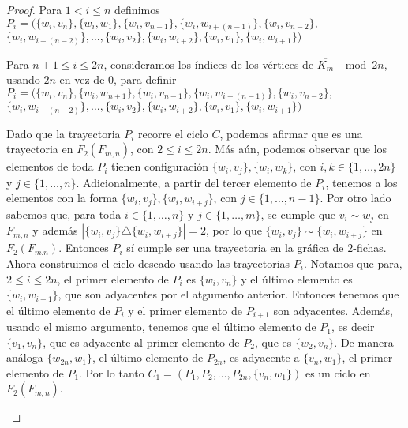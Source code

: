 \begin{proof}
    Para $1 < i \leq n$ definimos
    $P_i=(\{w_i,v_n\},\{w_i,w_1\},\{w_i,v_{n-1}\},\{w_i,w_{i+(n-1)}\},\{w_i,v_{n-2}\},$
    $\{w_i,w_{i+(n-2)}\},\dots,\{w_i,v_2\},\{w_i,w_{i+2}\},\{w_i,v_1\},\{w_i,w_{i+1}\})$

    Para $n+1\leq i \leq 2n$, consideramos los \'indices de los v\'ertices de
    $\overline{K_m}$ $\mod 2n$, usando $2n$ en vez de $0$, para definir
    $P_i=(\{w_i,v_n\},\{w_i,w_{n+1}\},\{w_i,v_{n-1}\},\{w_i,w_{i+(n-1)}\},\{w_i,v_{n-2}\},$
    $\{w_i,w_{i+(n-2)}\},\dots,
    \{w_i,v_2\},\{w_i,w_{i+2}\},\{w_i,v_1\},\{w_i,w_{i+1}\})$

    Dado que la trayectoria $P_i$ recorre el ciclo $C$, podemos afirmar que es
    una trayectoria en $F_2(F_{m,n})$, con $2\leq i \leq 2n$. M\'as a\'un,
    podemos observar que los elementos de toda $P_i$ tienen configuraci\'on
    $\{w_i,v_j\},\{w_i,w_k\}$, con $i, k\in \{1, \dots, 2n\}$ y $j \in \{1,
    \dots, n\}$. Adicionalmente, a partir del tercer elemento de $P_i$, tenemos a
    los elementos con la forma $\{w_i,v_j\},\{w_i,w_{i+j}\}$, con $j \in \{1,
    \dots, n-1\}$.  Por otro lado sabemos que, para toda $i \in \{1, \dots, n\}$
    y $j \in \{1, \dots, m\}$, se cumple que $v_i \sim w_j$ en $F_{m,n}$ y
    adem\'as $|\{w_i,v_j\} \triangle \{w_i, w_{i+j}\}|=2$, por lo que
    $\{w_i,v_j\} \sim \{w_i, w_{i+j}\}$ en $F_2(F_{m.n})$. Entonces $P_i$ s\'i
    cumple ser una trayectoria en la gr\'afica de $2$-fichas. Ahora construimos
    el ciclo deseado usando las trayectorias $P_i$. Notamos que para, $2 \leq i
    \leq 2n$, el primer elemento de $P_i$ es $\{w_i, v_n\}$ y el \'ultimo
    elemento es $\{w_i, w_{i+1}\}$, que son adyacentes por el atgumento
    anterior. Entonces tenemos que el \'ultimo elemento de $P_i$ y el primer
    elemento de $P_{i+1}$ son adyacentes. Adem\'as, usando el mismo argumento,
    tenemos que el \'ultimo elemento de $P_1$, es decir $\{v_1,v_n\}$, que es
    adyacente al primer elemento de $P_2$, que es $\{w_2,v_n\}$. De manera
    an\'aloga $\{w_{2n},w_1\}$, el \'ultimo elemento de $P_{2n}$, es adyacente a
    $\{v_n,w_1\}$, el primer elemento de $P_1$. Por lo tanto $C_1 = (P_1,P_2,
    \dots, P_{2n},\{v_n,w_1\})$ es un ciclo en $F_2(F_{m,n})$. 
  
    \begin{figure}[ht!]
        \centering
           \begin{tikzpicture}


\end{tikzpicture}
\end{figure}
\end{proof}
